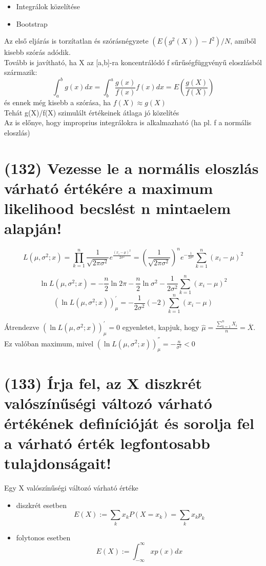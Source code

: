 \documentclass[12p]{article}
\begin{document}
\begin{itemize}
\item Integrálok közelítése
\item Bootstrap
\end{itemize}

Az első eljárás is torzítatlan és szórásnégyzete $(E(g^2(X)) - I^2) / N$, amiből kisebb szórás adódik.\\
Tovább is javítható, ha X az [a,b]-ra koncentrálódó f sűrűségfüggvényű eloszlásból származik:
$$\int^b_a g(x)dx = \int^a_b \frac{g(x)}{f(x)} f(x)dx = E (\frac{g(X)}{f(X)})$$
és ennek még kisebb a szórása, ha $f(X) \approx g(X)$\\
Tehát g(X)/f(X) szimulált értékeinek átlaga jó közelítés\\
Az is előnye, hogy improprius integrálokra is alkalmazható (ha pl. f a normális eloszlás)

\section{(132) Vezesse le a normális eloszlás várható értékére a maximum likelihood becslést n mintaelem alapján!}

$$L(\mu, \sigma^2;x) 
= \prod^n_{k=1} \frac{1}{\sqrt{2\pi \sigma^2}} 
e^{\frac{(x_i-\mu)^2}{2\sigma^2}}
=\left(\frac{1}{\sqrt{2\pi \sigma^2}}\right)^n 
e^{-\frac{1}{2 \sigma^2}} \sum^n_{k=1} (x_i - \mu )^2$$

$$\ln L(\mu, \sigma^2;x) = - \frac{n}{2} \ln 2\pi - \frac{n}{2} \ln \sigma^2 - \frac{1}{2\sigma^2} \sum^n_{k=1} (x_i - \mu)^2$$
$$(\ln L(\mu,\sigma^2;x))^{'}_{\mu} = - \frac{1}{2\sigma^2}(-2)\sum^n_{k=1}(x_i - \mu)$$

Átrendezve $(\ln L(\mu,\sigma^2;x))^{'}_{\mu} = 0$ egyenletet, kapjuk, hogy $\displaystyle{\hat{\mu} = \frac{\sum^n_{k=1} X_i}{n} = \overline{X}}$. Ez valóban maximum, mivel $(\ln L(\mu,\sigma^2;x))^{''}_{\mu} = -\frac{n}{\sigma^2} < 0$

\section{(133) Írja fel, az X diszkrét valószínűségi változó várható értékének definícióját és sorolja fel
a várható érték legfontosabb tulajdonságait!}

Egy X valószínűségi változó várható értéke

\begin{itemize}
	\item diszkrét esetben
		$$E(X) := \sum_k x_k P(X = x_k) = \sum_k x_k p_k$$
		
	\item folytonos esetben
		$$E(X) := \int_{-\infty}^\infty xp(x)dx$$
\end{itemize}
\end{document}
